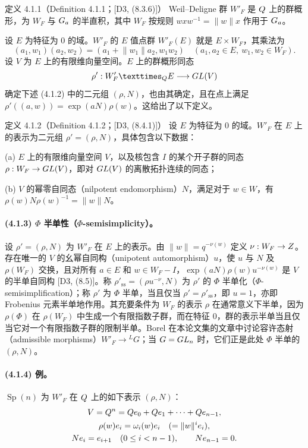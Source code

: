\begin{originaltheorem}{定义 4.1.1（Definition 4.1.1；[D3, (8.3.6)]）}
Weil--Deligne 群 $W'_F$ 是 $Q$ 上的群概形，为 $W_F$ 与 $G_{a}$ 的半直积，其中 $W_F$ 按规则 $wxw^{-1}=\lVert w\rVert x$ 作用于 $G_{a}$。
\end{originaltheorem}
设 $E$ 为特征为 $0$ 的域。$W'_F$ 的 $E$ 值点群 $W'_F(E)$ 就是 $E\times W_F$，其乘法为
\[
 (a_1,w_1)(a_2,w_2)=(a_1+\lVert w_1\rVert a_2,w_1w_2)
 \quad(a_1,a_2\in E,\ w_1,w_2\in W_F).
\]
设 $V$ 为 $E$ 上的有限维向量空间。$E$ 上的群概形同态
\[
 \rho':W'_F\times_{\Q}E\longrightarrow\GL(V)
\]
确定下述 (4.1.2) 中的二元组 $(\rho,N)$，也由其确定，且在点上满足 $\rho'((a,w))=\exp(aN)\rho(w)$。这给出了以下定义。

\begin{originaltheorem}{定义 4.1.2（Definition 4.1.2；[D3, (8.4.1)]）}
设 $E$ 为特征为 $0$ 的域。$W'_F$ 在 $E$ 上的表示为二元组 $\rho'=(\rho,N)$，具体包含以下数据：

(a) $E$ 上的有限维向量空间 $V$，以及核包含 $I$ 的某个开子群的同态 $\rho:W_F\to GL(V)$，即对 $GL(V)$ 的离散拓扑连续的同态；

(b) $V$ 的幂零自同态（nilpotent endomorphism）$N$，满足对于 $w\in W$，有 $\rho(w)N\rho(w)^{-1}=\lVert w\rVert N$。
\end{originaltheorem}

\paragraph*{(4.1.3) $\Phi$ 半单性（$\Phi$-semisimplicity）。}
设 $\rho'=(\rho,N)$ 为 $W'_F$ 在 $E$ 上的表示。由 $\lVert w\rVert=q^{-\nu(w)}$ 定义 $\nu:W_F\to Z$。存在唯一的 $V$ 的幺幂自同构（unipotent automorphism）$u$，使 $u$ 与 $N$ 及 $\rho(W_F)$ 交换，且对所有 $a\in E$ 和 $w\in W_F-I$，$\exp(aN)\rho(w)u^{-\nu(w)}$ 是 $V$ 的半单自同构 [D3, (8.5)]。称 $\rho'_{\mathrm{ss}}=(\rho u^{-\nu},N)$ 为 $\rho'$ 的 $\Phi$ 半单化（$\Phi$-semisimplification）；称 $\rho'$ 为 $\Phi$ 半单，当且仅当 $\rho'=\rho'_{\mathrm{ss}}$，即 $u=1$，亦即 Frobenius 元素半单地作用。其充要条件为 $W_F$ 的表示 $\rho$ 在通常意义下半单，因为 $\rho(\Phi)$ 在 $\rho(W_F)$ 中生成一个有限指数子群，而在特征 $0$，群的表示半单当且仅当它对一个有限指数子群的限制半单。Borel 在本论文集的文章中讨论容许态射（admissible morphisms）$W'_F\to{}^LG$；当 $G=GL_n$ 时，它们正是此处 $\Phi$ 半单的 $(\rho,N)$。

\paragraph*{(4.1.4) 例。}
$\operatorname{Sp}(n)$ 为 $W'_F$ 在 $Q$ 上的如下表示 $(\rho,N)$：
\[
\begin{gathered}
 V=Q^n=Q e_0+Q e_1+\cdots+Q e_{n-1},\\
 \rho(w)e_i=\omega_i(w)e_i\quad(=\lVert w\rVert^i e_i),\\
 Ne_i=e_{i+1}\quad(0\leq i<n-1),\qquad Ne_{n-1}=0.
\end{gathered}
\]
